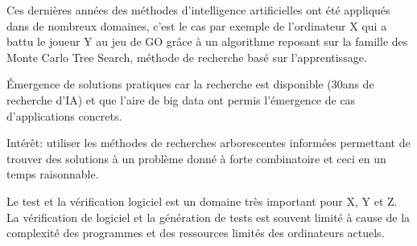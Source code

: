 Ces dernières années des méthodes d'intelligence artificielles ont été appliqués dans de nombreux domaines, c'est le cas par exemple de l'ordinateur X qui a battu le joueur Y au jeu de GO grâce à un algorithme reposant sur la famille des Monte Carlo Tree Search, méthode de recherche basé sur l'apprentissage\cite{shadow}.

Émergence de solutions pratiques\cite{ART} car la recherche est disponible (30ans de recherche d'IA) et que l'aire de big data ont permis l'émergence de cas d'applications concrets.

Intérêt: utiliser les méthodes de recherches arborescentes informées permettant de trouver des solutions à un problème donné à forte combinatoire et ceci en un temps raisonnable.

Le test et la vérification logiciel est un domaine très important pour X, Y et Z.
La vérification de logiciel et la génération de tests est souvent limité à cause de la complexité des programmes et des ressources limités des ordinateurs actuels.


